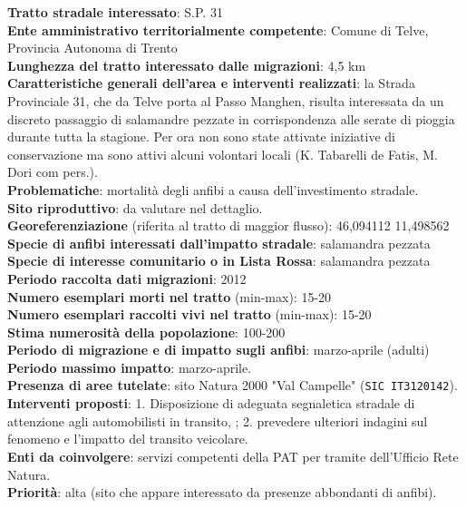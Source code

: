 \documentclass[11pt,a4paper,twoside]{memoir}
\begin{document}
\textbf{Tratto stradale interessato}: S.P. 31  \\
\textbf{Ente amministrativo territorialmente competente}: Comune di Telve, Provincia Autonoma di Trento  \\
\textbf{Lunghezza del tratto interessato dalle migrazioni}: 4,5 km \\
\textbf{Caratteristiche generali dell’area e interventi realizzati}: la Strada Provinciale 31, che da Telve porta al Passo Manghen, risulta interessata da un discreto passaggio di salamandre pezzate in corrispondenza alle serate di pioggia durante tutta la stagione. Per ora non sono state attivate iniziative di conservazione ma sono attivi alcuni volontari locali (K. Tabarelli de Fatis, M. Dori com pers.). \\
\textbf{Problematiche}: mortalità degli anfibi a causa dell'investimento stradale. \\
\textbf{Sito riproduttivo}: da valutare nel dettaglio. \\
\textbf{Georeferenziazione} (riferita al tratto di maggior flusso): 46,094112 11,498562 \\
\textbf{Specie di anfibi interessati dall’impatto stradale}: salamandra pezzata \\
\textbf{Specie di interesse comunitario o in Lista Rossa}: salamandra pezzata \\
\textbf{Periodo raccolta dati migrazioni}: 2012 \\
\textbf{Numero esemplari morti nel tratto} (min-max): 15-20 \\
\textbf{Numero esemplari raccolti vivi nel tratto} (min-max): 15-20 \\
\textbf{Stima numerosità della popolazione}: 100-200 \\
\textbf{Periodo di migrazione e di impatto sugli anfibi}: marzo-aprile (adulti) \\
\textbf{Periodo massimo impatto}: marzo-aprile. \\
\textbf{Presenza di aree tutelate}: sito Natura 2000 "Val Campelle" (\texttt{SIC IT3120142}). \\
\textbf{Interventi proposti}: 1. Disposizione di adeguata segnaletica stradale di attenzione agli automobilisti in transito, ; 2. prevedere ulteriori  indagini sul fenomeno e l’impatto del transito veicolare. \\
\textbf{Enti da coinvolgere}: servizi competenti della PAT per tramite dell’Ufficio Rete Natura. \\
\textbf{Priorità}: alta (sito che appare interessato da presenze abbondanti di anfibi). \\
\end{document}

